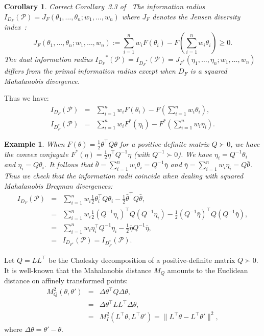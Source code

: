 \documentclass[11pt]{article}
\newtheorem{example}{Example}
\newtheorem{corollary}{Corollary}
\def\calP{\mathcal{P}}
\def\eqdef{:=}
\begin{document}
\begin{corollary}{Correct Corollary~3.3 of~\cite{SBD-2009}}
The information radius $I_{D_F}(\calP)=J_F(\theta_1,\ldots,\theta_n;w_1,\ldots, w_n)$ where $J_F$ denotes the {\em Jensen diversity index}~\cite{GenJS-2020}:
\begin{equation}
J_F(\theta_1,\ldots,\theta_n;w_1,\ldots, w_n)\eqdef \sum_{i=1}^n w_i F(\theta_i)-F\left(\sum_{i=1}^n w_i\theta_i\right)\geq 0.
\end{equation}
The dual information radius ${I_{D_F}}^*(\calP)=I_{{D_F}^*}(\calP)=J_{F^*}(\eta_1,\ldots,\eta_n;w_1,\ldots, w_n)$ differs from the primal information radius except when $D_F$ is a squared Mahalanobis divergence.
\end{corollary}

Thus we have:
\begin{eqnarray}
I_{D_F}(\calP) &=& \sum_{i=1}^n w_i F(\theta_i)- F\left(\sum_{i=1}^n w_i\theta_i\right),\\
I_{D_F^*}(\calP) &=& \sum_{i=1}^n w_iF^*(\eta_i)-  F^*\left(\sum_{i=1}^n w_i\eta_i\right).
\end{eqnarray}

\begin{example}
When $F(\theta)=\frac{1}{2}\theta^\top Q\theta$ for a positive-definite matrix $Q\succ 0$, we have the convex conjugate $F^*(\eta)=\frac{1}{2}\eta^\top Q^{-1}\eta$ (with $Q^{-1}\succ 0$). We have 
$\eta_i=Q^{-1}\theta_i$ and $\eta_i=Q\theta_i$.
It follows that $\bar\theta=\sum_{i=1}^n w_i\theta_i=Q^{-1}\bar\eta$
 and
$\bar\eta=\sum_{i=1}^n w_i\eta_i=Q\bar\theta$.
Thus we check that the information radii coincide when dealing with squared Mahalanobis Bregman divergences:
\begin{eqnarray}
I_{D_F}(\calP) &=& \sum_{i=1}^n w_i \frac{1}{2}\theta_i^\top Q\theta_i - \frac{1}{2}\bar\theta^\top Q\bar\theta,\\
&=&  \sum_{i=1}^n w_i \frac{1}{2}(Q^{-1}\eta_i)^\top Q (Q^{-1}\eta_i) - \frac{1}{2} (Q^{-1}\bar\eta)^\top Q (Q^{-1}\bar\eta),\\
&=& \sum_{i=1}^n w_i \eta_i^\top Q^{-1}\eta_i - \frac{1}{2} \bar\eta Q^{-1}\bar\eta,\\
&=& I_{D_{F^*}}(\calP)= I_{D_F^*}(\calP).
\end{eqnarray}

\end{example}


Let $Q=LL^\top$ be the Cholesky decomposition of a positive-definite matrix $Q\succ 0$. 
It is well-known that the Mahalanobis distance $M_Q$ amounts to the Euclidean distance on affinely transformed points:
\begin{eqnarray}
M_Q^2(\theta,\theta') &=& \Delta\theta^\top Q\Delta\theta,\\
&=&\Delta\theta^\top LL^\top\Delta\theta,\\
&=& M_I^2(L^\top\theta,L^\top\theta')=\|L^\top\theta-L^\top\theta'\|^2,
\end{eqnarray}
where $\Delta\theta=\theta'-\theta$.
\end{document}
